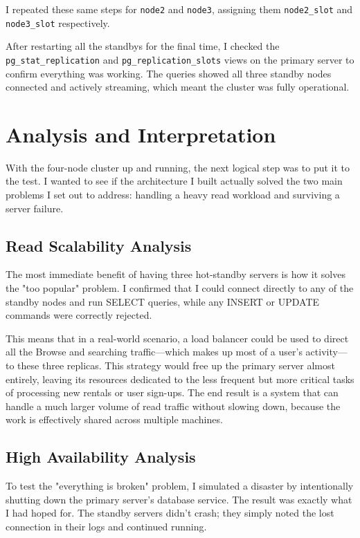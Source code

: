 \documentclass[conference]{IEEEtran}
\begin{document}
I repeated these same steps for \texttt{node2} and \texttt{node3}, assigning them \texttt{node2\_slot} and \texttt{node3\_slot} respectively.

After restarting all the standbys for the final time, I checked the \texttt{pg\_stat\_replication} and \texttt{pg\_replication\_slots} views on the primary server to confirm everything was working. The queries showed all three standby nodes connected and actively streaming, which meant the cluster was fully operational.


\section{Analysis and Interpretation}
With the four-node cluster up and running, the next logical step was to put it to the test. I wanted to see if the architecture I built actually solved the two main problems I set out to address: handling a heavy read workload and surviving a server failure.

\subsection{Read Scalability Analysis}
The most immediate benefit of having three hot-standby servers is how it solves the "too popular" problem. I confirmed that I could connect directly to any of the standby nodes and run SELECT queries, while any INSERT or UPDATE commands were correctly rejected.

This means that in a real-world scenario, a load balancer could be used to direct all the Browse and searching traffic—which makes up most of a user's activity—to these three replicas. This strategy would free up the primary server almost entirely, leaving its resources dedicated to the less frequent but more critical tasks of processing new rentals or user sign-ups. The end result is a system that can handle a much larger volume of read traffic without slowing down, because the work is effectively shared across multiple machines.

\subsection{High Availability Analysis}
To test the "everything is broken" problem, I simulated a disaster by intentionally shutting down the primary server's database service. The result was exactly what I had hoped for. The standby servers didn't crash; they simply noted the lost connection in their logs and continued running.
\end{document}
